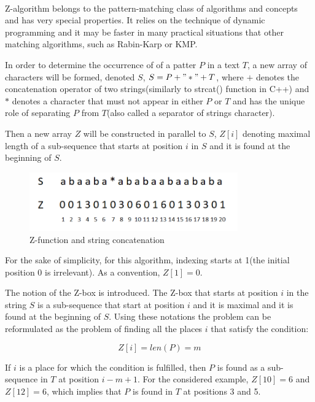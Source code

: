 \documentclass[letterpaper]{article}
\begin{document}
\paragraph{}

Z-algorithm belongs to the pattern-matching class of algorithms and concepts and has very special properties. It relies on the technique of dynamic programming and it may be faster in many practical situations that other matching algorithms, such as Rabin-Karp or KMP.

In order to determine the occurrence of of a patter $P$ in a text $T$, a new array of characters will be formed, denoted $S$, $S = P + "*" + T$, where $+$ denotes the concatenation operator of two strings(similarly to strcat() function in C++) and $*$ denotes a character that must not appear in either $P$ or $T$ and has the unique role of separating $P$ from $T$(also called a separator of strings character).

Then a new array $Z$ will be constructed in parallel to $S$, $Z[i]$ denoting maximal length of a sub-sequence that starts at position $i$ in $S$ and it is found at the beginning of $S$. 

\begin{figure} [h!]
\centering
\includegraphics[width=0.8\textwidth]{pngOfDiagrams/zfunction.png}
\caption{Z-function and string concatenation}
\end{figure}

For the sake of simplicity, for this algorithm, indexing starts at 1(the initial position 0 is irrelevant). As a convention, $Z[1] = 0$.

The notion of the Z-box is introduced. The Z-box that starts at position $i$ in the string $S$ is a sub-sequence that start at position $i$ and it is maximal and it is found at the beginning of $S$. Using these notations the problem can be reformulated as the problem of finding all the places $i$ that satisfy the condition: 

$$
Z[i] = len(P) = m
$$

If $i$ is a place for which the condition is fulfilled, then $P$ is found as a sub-sequence in $T$ at position $i - m + 1$. For the considered example, $Z[10] = 6$ and $Z[12] = 6$, which implies that $P$ is found in $T$ at positions 3 and 5.
\end{document}
